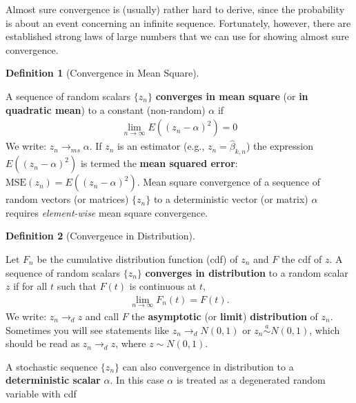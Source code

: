 \documentclass[
  letterpaper,
  DIV=11,
  numbers=noendperiod]{scrreprt}
\theoremstyle{definition}
\newtheorem{definition}{Definition}[chapter]
\theoremstyle{plain}
\theoremstyle{plain}
\theoremstyle{remark}
\begin{document}
Almost sure convergence is (usually) rather hard to derive, since the
probability is about an event concerning an infinite sequence.
Fortunately, however, there are established strong laws of large numbers
that we can use for showing almost sure convergence.

\leavevmode{}%
\begin{definition}[Convergence in Mean Square]\label{def-conv_ms}

A sequence of random scalars \(\{z_n\}\) \textbf{converges in mean
square} (or \textbf{in quadratic mean}) to a constant (non-random)
\(\alpha\) if \begin{eqnarray*}
  \lim_{n\to\infty}E\left((z_n-\alpha)^2\right)=0
\end{eqnarray*} We write: \(z_n\to_{ms}\alpha\). If \(z_n\) is an
estimator (e.g., \(z_n=\hat\beta_{k,n}\)) the expression
\(E\left((z_n-\alpha)^2\right)\) is termed the \textbf{mean squared
error}: \(\text{MSE}(z_n)=E\left((z_n-\alpha)^2\right)\). Mean square
convergence of a sequence of random vectors (or matrices) \(\{z_n\}\) to
a deterministic vector (or matrix) \(\alpha\) requires
\emph{element-wise} mean square convergence.

\end{definition}

\leavevmode{}%
\begin{definition}[Convergence in Distribution]\label{def-conv_distr}

Let \(F_n\) be the cumulative distribution function (cdf) of \(z_n\) and
\(F\) the cdf of \(z\). A sequence of random scalars \(\{z_n\}\)
\textbf{converges in distribution} to a random scalar \(z\) if for all
\(t\) such that \(F(t)\) is continuous at \(t\), \begin{eqnarray*}
  \lim_{n\to\infty}F_n(t)=F(t).
\end{eqnarray*} We write: \(z_n\to_{d} z\) and call \(F\) the
\textbf{asymptotic} (or \textbf{limit}) \textbf{distribution} of
\(z_n\). Sometimes you will see statements like \(z_n\to_{d} N(0,1)\) or
\(z_n\overset{a}{\sim}N(0,1)\), which should be read as
\(z_n\to_{d} z\), where \(z\sim N(0,1)\).

\end{definition}

A stochastic sequence \(\{z_n\}\) can also convergence in distribution
to a \textbf{deterministic scalar} \(\alpha\). In this case \(\alpha\)
is treated as a degenerated random variable with cdf
\end{document}
